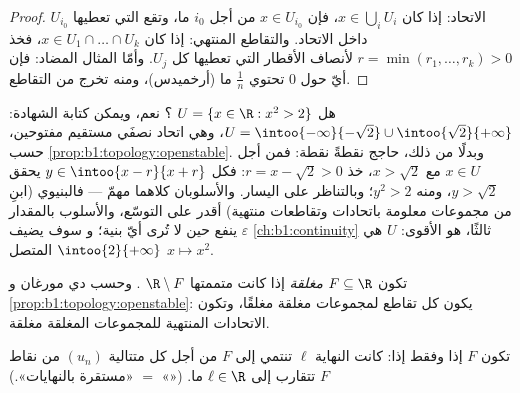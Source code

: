 \begin{proof}
الاتحاد: إذا كان $x \in \bigcup_i U_i$، فإن $x \in U_{i_0}$ من أجل $i_0$ ما،
وتقع  التي تعطيها $U_{i_0}$ داخل الاتحاد. والتقاطع
المنتهي: إذا كان $x \in U_1 \cap \dots \cap U_k$، فخذ $r = \min(r_1,
\dots, r_k) > 0$ لأنصاف الأقطار التي تعطيها كل $U_j$. وأمّا
المثال المضاد: فإن أيّ  حول $0$ تحتوي $\frac{1}{n}$ ما
(أرخميدس)، ومنه تخرج من التقاطع.
\end{proof}

\begin{example}\label{ex:b1:topology:radii}
هل $U = \{x \in \R : x^2 > 2\}$ ؟ نعم، ويمكن كتابة
الشهادة: $U = \intoo{-\infty}{-\sqrt2} \cup
\intoo{\sqrt2}{+\infty}$، وهي اتحاد نصفَي مستقيم مفتوحين، 
حسب \cref{prop:b1:topology:openstable}. وبدلًا من ذلك، حاجج
نقطةً نقطة: فمن أجل $x \in U$ مع $x > \sqrt 2$، خذ $r = x -
\sqrt2 > 0$: فكل $y \in \intoo{x - r}{x + r}$ يحقق $y >
\sqrt 2$، ومنه $y^2 > 2$؛ وبالتناظر على اليسار. والأسلوبان
كلاهما مهمّ --- فالبنيوي (ابنِ من مجموعات 
معلومة باتحادات وتقاطعات منتهية) أقدر على التوسّع، والأسلوب
بالمقدار $\varepsilon$ ينفع حين لا تُرى أيّ بنية؛ و
سوف يضيف \cref{ch:b1:continuity} ثالثًا، هو الأقوى:
 $U$ هي   $\intoo{2}{+\infty}$ 
المتصل $x \mapsto x^2$.
\end{example}

\begin{definition}\label{def:b1:topology:closed}
تكون  $F \subseteq \R$ \emph{مغلقة} إذا كانت
متممتها $\R \setminus F$ . وحسب دي مورغان و
\cref{prop:b1:topology:openstable}: يكون كل تقاطع لمجموعات مغلقة
مغلقًا، وتكون الاتحادات المنتهية للمجموعات المغلقة مغلقة.
\end{definition}

\begin{theorem}\label{thm:b1:topology:seqclosed}
تكون $F$  إذا وفقط إذا: كانت النهاية $\ell$ تنتمي إلى
$F$ من أجل كل متتالية $(u_n)$ من نقاط
$F$ تتقارب إلى $\ell \in \R$ ما. («» $=$ «مستقرة بالنهايات».)
\end{theorem}

